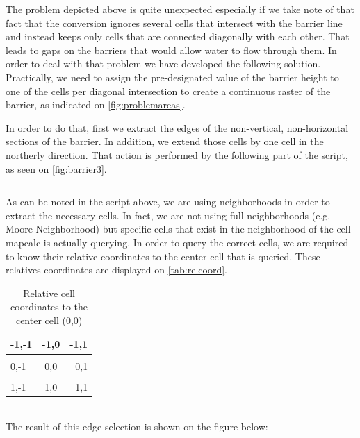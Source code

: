 The problem depicted above is quite unexpected especially if we take note of that fact that the conversion ignores several cells that intersect with the barrier line and instead keeps only cells that are connected diagonally with each other. That leads to gaps on the barriers that would allow water to flow through them. In order to deal with that problem we have developed the following solution. \\
Practically, we need to assign the pre-designated value of the barrier height to one of the cells per diagonal intersection to create a continuous raster of the barrier, as indicated on \autoref{fig:problemareas}. 

In order to do that, first we extract the edges of the non-vertical, non-horizontal sections of the barrier. In addition, we extend those cells by one cell in the northerly direction. That action is performed by the following part of the script, as seen on \autoref{fig:barrier3}.

\begin{lstlisting}

\end{lstlisting}

As can be noted in the script above, we are using neighborhoods in order to extract the necessary cells. In fact, we are not using full neighborhoods (e.g. Moore Neighborhood) but specific cells that exist in the neighborhood of the cell mapcalc is actually querying. In order to query the correct cells, we are required to know their relative coordinates to the center cell that is queried. These relatives coordinates are displayed on \autoref{tab:relcoord}.\\

\begin{table}
\centering
\begin{tabular}{l | c | r}
-1,-1 & -1,0 & -1,1 \\
\hline \\
0,-1 & 0,0 & 0,1 \\
\hline \\
1,-1 & 1,0 & 1,1 \\
\end{tabular}
\caption{Relative cell coordinates to the center cell (0,0)}
\label{tab:relcoord}
\end{table}\\

The result of this edge selection is shown on the figure below:\\
\\


